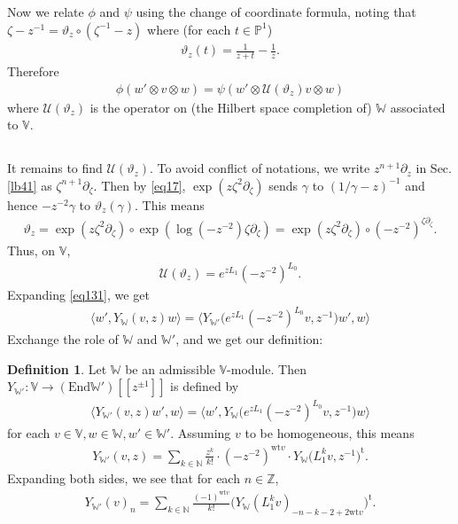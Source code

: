 \documentclass[11pt,b5paper,notitlepage]{article}
\theoremstyle{definition}
\newtheorem{df}{Definition}[section]
\theoremstyle{plain}
\newcommand{\mc}{\mathcal}
\newcommand{\tr}{\mathrm{t}} %
\newcommand{\End}{\mathrm{End}} %
\newcommand{\bigbk}[1]{\big\langle {#1}\big\rangle}
\newcommand{\Vbb}{\mathbb V}
\newcommand{\Wbb}{\mathbb W}
\newcommand{\Nbb}{\mathbb N}
\newcommand{\Zbb}{\mathbb Z}
\newcommand{\Pbb}{\mathbb P}
\newcommand{\wt}{\mathrm{wt}}
\numberwithin{equation}{section}
\begin{document}
Now we relate $\phi$ and $\psi$ using the change of coordinate formula, noting that $\zeta-z^{-1}=\vartheta_z\circ(\zeta^{-1}-z)$ where (for each $t\in\Pbb^1$) 
\begin{align}
\vartheta_z(t)=\frac1{z+t}-\frac 1z.\label{eq195}
\end{align}
Therefore
\begin{align}
\phi(w'\otimes v\otimes w)=\psi(w'\otimes \mc U(\vartheta_z) v\otimes w)\label{eq131}	
\end{align}
where $\mc U(\vartheta_z)$ is the operator on (the Hilbert space completion of) $\Wbb$ associated to $\Vbb$.

\subsection{}

It remains to find $\mc U(\vartheta_z)$. To avoid conflict of notations, we write $z^{n+1}\partial_z$ in Sec. \ref{lb41} as $\zeta^{n+1}\partial_\zeta$. Then by \eqref{eq17}, $\exp(z\zeta^2\partial_\zeta)$ sends $\gamma$ to $(1/\gamma-z)^{-1}$ and hence $-z^{-2}\gamma$ to $\vartheta_z(\gamma)$. This means
\begin{align}
\vartheta_z=\exp(z\zeta^2\partial_\zeta)\circ \exp(\log(-z^{-2})\zeta\partial_\zeta)=\exp(z\zeta^2\partial_\zeta)\circ (-z^{-2})^{\zeta\partial_\zeta}.
\end{align}
Thus, on $\Vbb$,
\begin{align}
\mc U(\vartheta_z)=e^{zL_1}(-z^{-2})^{L_0}.	\label{eq196}
\end{align}
Expanding \eqref{eq131}, we get
\begin{align*}
\bigbk{w',Y_\Wbb(v,z)w}=\bigbk{Y_{\Wbb'}\big(e^{zL_1}(-z^{-2})^{L_0}v,z^{-1}\big)w',w}	
\end{align*}
Exchange the role of $\Wbb$ and $\Wbb'$, and we get our definition:

\begin{df}
Let $\Wbb$ be an admissible $\Vbb$-module. Then $Y_{\Wbb'}:\Vbb\rightarrow(\End\Wbb')[[z^{\pm1}]]$ is defined by
\begin{align}
\bigbk{Y_{\Wbb'}(v,z)w',w}=\bigbk{w',Y_\Wbb\big(e^{zL_1}(-z^{-2})^{L_0}v,z^{-1}\big)w}\label{eq141}		
\end{align}
for each $v\in\Vbb,w\in\Wbb,w'\in\Wbb'$. Assuming $v$ to be homogeneous, this means
\begin{align}
Y_{\Wbb'}(v,z)=\sum_{k\in\Nbb}\frac {z^k}{k!}\cdot (-z^{-2})^{\wt v}\cdot Y_\Wbb\big(L_1^kv,z^{-1}\big)^\tr.
\end{align}
Expanding both sides, we see that for each $n\in\Zbb$,
\begin{align}
Y_{\Wbb'}(v)_n=\sum_{k\in\Nbb}\frac{(-1)^{\wt v}}{k!}\big(Y_\Wbb(L_1^kv)_{-n-k-2+2\wt v}\big)^\tr.\label{eq133}
\end{align}
\end{df}
\end{document}
